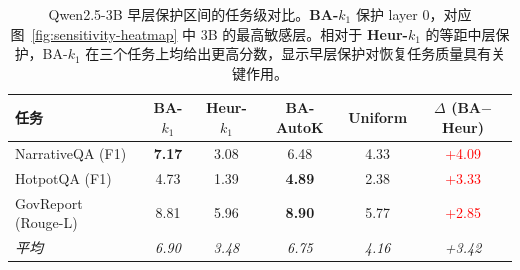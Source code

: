 \begin{table}[!htbp]
  \centering
  \small
  \setlength{\tabcolsep}{6pt}
  \begin{tabular}{l cccc c}
    \toprule
    \textbf{任务} & \textbf{BA-$k_1$} & Heur-$k_1$ & BA-AutoK & Uniform & $\Delta$ (BA$-$Heur) \\
    \midrule
    NarrativeQA (F1) & \textbf{7.17} & 3.08 & 6.48 & 4.33 & \textcolor{red}{+4.09} \\
    HotpotQA (F1) & 4.73 & 1.39 & \textbf{4.89} & 2.38 & \textcolor{red}{+3.33} \\
    GovReport (Rouge-L) & 8.81 & 5.96 & \textbf{8.90} & 5.77 & \textcolor{red}{+2.85} \\
    \midrule
    \textit{平均} & \textit{6.90} & \textit{3.48} & \textit{6.75} & \textit{4.16} & \textit{+3.42} \\
    \bottomrule
  \end{tabular}
  \caption{Qwen2.5-3B 早层保护区间的任务级对比。\textbf{BA-$k_1$} 保护 layer 0，对应图~\ref{fig:sensitivity-heatmap} 中 3B 的最高敏感层。相对于 \textbf{Heur-$k_1$} 的等距中层保护，BA-$k_1$ 在三个任务上均给出更高分数，显示早层保护对恢复任务质量具有关键作用。}
  \label{tab:t5-3b-early-layer}
  \par\smallskip{}
\end{table}
